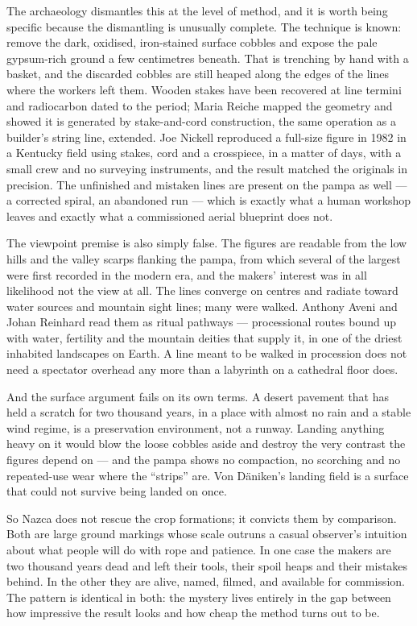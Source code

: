 The archaeology dismantles this at the level of method, and it is worth being specific because the
dismantling is unusually complete. The technique is known: remove the dark, oxidised, iron-stained
surface cobbles and expose the pale gypsum-rich ground a few centimetres beneath. That is trenching
by hand with a basket, and the discarded cobbles are still heaped along the edges of the lines where
the workers left them. Wooden stakes have been recovered at line termini and radiocarbon dated to
the period; Maria Reiche mapped the geometry and showed it is generated by stake-and-cord
construction, the same operation as a builder's string line, extended. Joe Nickell reproduced a
full-size figure in 1982 in a Kentucky field using stakes, cord and a crosspiece, in a matter of
days, with a small crew and no surveying instruments, and the result matched the originals in
precision. The unfinished and mistaken lines are present on the pampa as well --- a corrected
spiral, an abandoned run --- which is exactly what a human workshop leaves and exactly what a
commissioned aerial blueprint does not.

The viewpoint premise is also simply false. The figures are readable from the low hills and the
valley scarps flanking the pampa, from which several of the largest were first recorded in the
modern era, and the makers' interest was in all likelihood not the view at all. The lines converge
on centres and radiate toward water sources and mountain sight lines; many were walked. Anthony
Aveni and Johan Reinhard read them as ritual pathways --- processional routes bound up with water,
fertility and the mountain deities that supply it, in one of the driest inhabited landscapes on
Earth. A line meant to be walked in procession does not need a spectator overhead any more than a
labyrinth on a cathedral floor does.

And the surface argument fails on its own terms. A desert pavement that has held a scratch for two
thousand years, in a place with almost no rain and a stable wind regime, is a preservation
environment, not a runway. Landing anything heavy on it would blow the loose cobbles aside and
destroy the very contrast the figures depend on --- and the pampa shows no compaction, no scorching
and no repeated-use wear where the ``strips'' are. Von D\"aniken's landing field is a surface that
could not survive being landed on once.

So Nazca does not rescue the crop formations; it convicts them by comparison. Both are large ground
markings whose scale outruns a casual observer's intuition about what people will do with rope and
patience. In one case the makers are two thousand years dead and left their tools, their spoil
heaps and their mistakes behind. In the other they are alive, named, filmed, and available for
commission. The pattern is identical in both: the mystery lives entirely in the gap between how
impressive the result looks and how cheap the method turns out to be.

